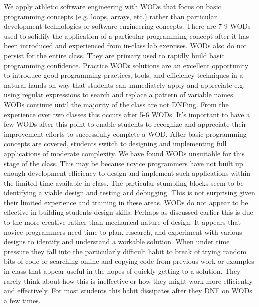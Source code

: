 We apply athletic software engineering with WODs that focus on basic programming concepts (e.g. loops, arrays, etc.) rather than particular development technologies or software engineering concepts. There are 7-9 WODs used to solidify the application of a particular programming concept after it has been introduced and experienced from in-class lab exercises. WODs also do not persist for the entire class. They are primary used to rapidly build basic programming confidence. Practice WODs solutions are an excellent opportunity to introduce good programming practices, tools, and efficiency techniques in a natural hands-on way that students can immediately apply and appreciate e.g. using regular expressions to search and replace a pattern of variable names. WODs continue until the majority of the class are not DNFing. From the experience over two classes this occurs after 5-6 WODs. It's important to have a few WODs after this point to enable students to recognize and appreciate their improvement efforts to successfully complete a WOD. After   basic programming concepts are covered, students switch to designing and implementing full applications of moderate complexity. We have found WODs unsuitable for this stage of the class. This may be because novice programmers have not built up enough development efficiency to design and implement such applications within the limited time available in class. The particular stumbling blocks seem to be identifying a viable design and testing and debugging. This is not surprising given their limited experience and training in these areas. WODs do not appear to be effective in building students design skills. Perhaps as discussed earlier this is due to the more creative rather than mechanical nature of design. It appears that novice programmers need time to plan, research, and experiment with various designs to identify and understand a workable solution. When under time pressure they fall into the particularly difficult habit to break of trying random bits of code or searching online and copying code from previous work or examples in class that appear useful in the hopes of quickly getting to a solution. They rarely think about how this is ineffective or how they might work more efficiently and effectively. For most students this habit dissipates after they DNF on WODs a few times.

